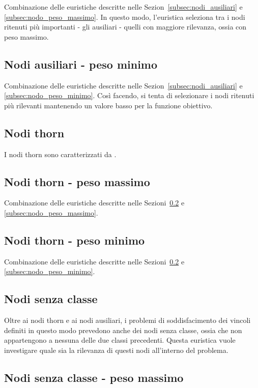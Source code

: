 Combinazione delle euristiche descritte nelle Sezion~\ref{subsec:nodi_ausiliari} e \ref{subsec:nodo_peso_massimo}. In questo modo, l'euristica seleziona tra i nodi ritenuti più importanti - gli ausiliari - quelli con maggiore rilevanza, ossia con peso massimo.

\subsection{Nodi ausiliari - peso minimo}

Combinazione delle euristiche descritte nelle Sezion~\ref{subsec:nodi_ausiliari} e \ref{subsec:nodo_peso_minimo}. Così facendo, si tenta di selezionare i nodi ritenuti più rilevanti mantenendo un valore basso per la funzione obiettivo.

\subsection{Nodi thorn}\label{subsec:nodi_thorn}

I nodi thorn sono caratterizzati da .

\subsection{Nodi thorn - peso massimo}

Combinazione delle euristiche descritte nelle Sezioni~\ref{subsec:nodi_thorn} e \ref{subsec:nodo_peso_massimo}.

\subsection{Nodi thorn - peso minimo}

Combinazione delle euristiche descritte nelle Sezioni~\ref{subsec:nodi_thorn} e \ref{subsec:nodo_peso_minimo}.

\subsection{Nodi senza classe}\label{subsec:nodi_senza_classe}

Oltre ai nodi thorn e ai nodi ausiliari, i problemi di soddisfacimento dei vincoli definiti in questo modo prevedono anche dei nodi senza classe, ossia che non appartengono a nessuna delle due classi precedenti. Questa euristica vuole investigare quale sia la rilevanza di questi nodi all'interno del problema.

\subsection{Nodi senza classe - peso massimo}

